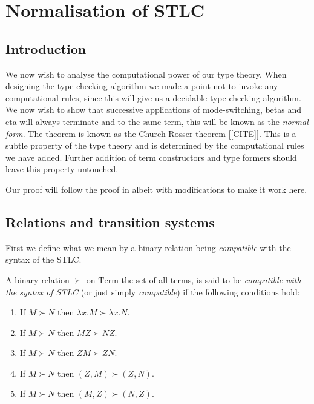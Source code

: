 \section{Normalisation of STLC}

\subsection{Introduction}
We now wish to analyse the computational power of our type theory. When designing the type checking algorithm we made a point not to invoke any computational rules, since this will give us a decidable type checking algorithm. We now wish to show that successive applications of mode-switching, betas and eta will always terminate and to the same term, this will be known as the \emph{normal form}. The theorem is known as the Church-Rosser theorem [[CITE]]. This is a subtle property of the type theory and is determined by the computational rules we have added. Further addition of term constructors and type formers should leave this property untouched.

Our proof will follow the proof in \cite[p. 67]{Sorensen:2006:LCI:1197021} albeit with modifications to make it work here. 

\subsection{Relations and transition systems}

First we define what we mean by a binary relation being \emph{compatible} with the syntax of the STLC.
\begin{defin}
    A binary relation $\succ$ on $\mathrm{Term}$ the set of all terms, is said to be \emph{compatible with the syntax of STLC} (or just simply \emph{compatible}) if the following conditions hold:
    \begin{enumerate}
        \item If $M \succ N$ then $\lambda x . M \succ \lambda x . N$.
        \item If $M \succ N$ then $M Z \succ N Z$.
        \item If $M \succ N$ then $Z M \succ Z N$.
        \item If $M \succ N$ then $(Z,M) \succ (Z,N)$.
        \item If $M \succ N$ then $(M, Z) \succ (N, Z)$.
    \end{enumerate}
\end{defin}

